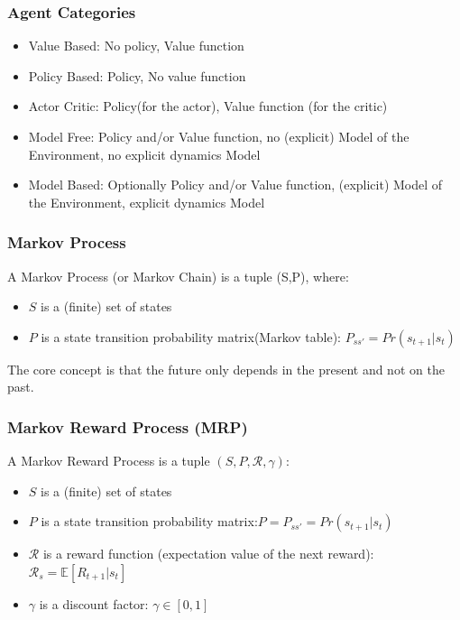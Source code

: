 \subsubsection{Agent Categories}
\begin{itemize}
    \item Value Based: No policy, Value function
    \item Policy Based: Policy, No value function
    \item Actor Critic: Policy(for the actor), Value function (for the critic)
    \item Model Free: Policy and/or Value function, no (explicit) Model of the Environment, no explicit dynamics Model
    \item Model Based: Optionally Policy and/or Value function, (explicit) Model of the Environment, explicit dynamics Model
\end{itemize}
\subsubsection{Markov Process}
A Markov Process (or Markov Chain) is a tuple (S,P), where:
\begin{itemize}
    \item \(S\) is a (finite) set of states
    \item \(P\) is a state transition probability matrix(Markov table): \(P_{ss'} = Pr(s_{t+1}|s_t)\)
\end{itemize}
The core concept is that the future only depends in the present and not on the past.
\subsubsection{Markov Reward Process (MRP)}
A Markov Reward Process is a tuple \((S,P,\mathcal{R},\gamma)\):
\begin{itemize}
    \item \(S\) is a (finite) set of states
    \item \(P\) is a state transition probability matrix:\(P = P_{ss'} = Pr(s_{t+1}|s_t)\)
    \item \(\mathcal{R}\) is a reward function (expectation value of the next reward): \(\mathcal{R}_s = \mathbb{E}\left[R_{t+1}|s_t\right]\)
    \item \(\gamma\) is a discount factor: \(\gamma \in \left[0,1\right]\)
\end{itemize}
